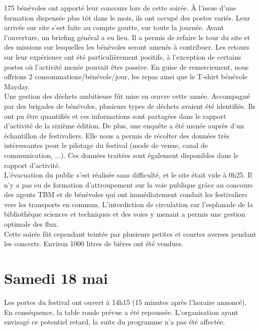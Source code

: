 \documentclass[12pt,a4paper]{report}
\begin{document}
175 bénévoles ont apporté leur concours lors de cette soirée. À l'issue d'une formation dispensée plus tôt dans le mois, ils ont occupé des postes variés. Leur arrivée sur site s'est faite au compte goutte, sur toute la journée. Avant l'ouverture, un briefing général a eu lieu. Il a permis de refaire le tour du site et des missions sur lesquelles les bénévoles seront amenés à contribuer. Les retours sur leur expérience ont été particulièrement positifs, à l'exception de certains postes où l'activité menée pouvait être passive. En guise de remerciement, nous offrions 2 consommations/bénévole/jour, les repas ainsi que le T-shirt bénévole Mayday.\\

Une gestion des déchets ambitieuse fût mise en œuvre cette année. Accompagné par des brigades de bénévoles, plusieurs types de déchets avaient été identifiés. Ils ont pu être quantifiés et ces informations sont partagées dans le rapport d'activité de la sixième édition. De plus, une enquête a été menée auprès d'un échantillon de festivaliers. Elle nous a permis de récolter des données très intéressantes pour le pilotage du festival (mode de venue, canal de communication, ...). Ces données traitées sont également disponibles dans le rapport d'activité.\\

L'évacuation du public s'est réalisée sans difficulté, et le site était vide à 0h25. Il n'y a pas eu de formation d'attroupement sur la voie publique grâce au concours des agents TBM et de bénévoles qui ont immédiatement conduit les festivaliers vers les transports en commun. L'interdiction de circulation sur l'esplanade de la bibliothèque sciences et techniques et des voies y menant a permis une gestion optimale des flux.\\

Cette soirée fût cependant teintée par plusieurs petites et courtes averses pendant les concerts. Environ 1000 litres de bières ont été vendues.

\section{Samedi 18 mai}

Les portes du festival ont ouvert à 14h15 (15 minutes après l'horaire annoncé). En conséquence, la table ronde prévue a été repoussée. L'organisation ayant envisagé ce potentiel retard, la suite du programme n'a pas été affectée.\\
\end{document}
